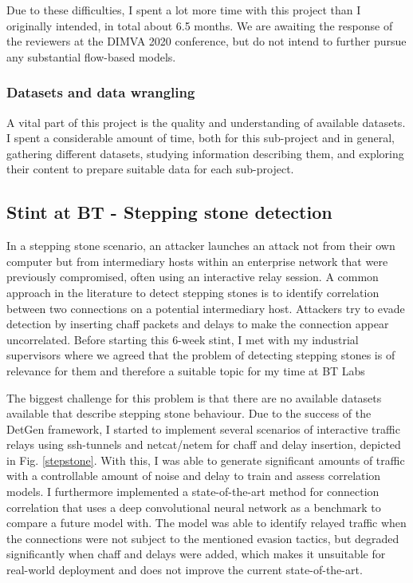 \documentclass[a4paper,12pt,twoside]{article}
\begin{document}
Due to these difficulties, I spent a lot more time with this project than I originally intended, in total about 6.5 months. We are awaiting the response of the reviewers at the DIMVA 2020 conference, but do not intend to further pursue any substantial flow-based models.

\subsubsection{Datasets and data wrangling} 
 
A vital part of this project is the quality and understanding of available datasets. I spent a considerable amount of time, both for this sub-project and in general, gathering different datasets, studying information describing them, and exploring their content to prepare suitable data for each sub-project.


\subsection{Stint at BT - Stepping stone detection}\label{Sec:BTstint}


In a stepping stone scenario, an attacker launches an attack not from their own computer but from intermediary hosts within an enterprise network that were previously compromised, often using an interactive relay session. A common approach in the literature to detect stepping stones is to identify correlation between two connections on a potential intermediary host. Attackers try to evade detection by inserting chaff packets and delays to make the connection appear uncorrelated. Before starting this 6-week stint, I met with my industrial supervisors where we agreed that the problem of detecting stepping stones is of relevance for them and therefore a suitable topic for my time at BT Labs

The biggest challenge for this problem is that there are no available datasets available that describe stepping stone behaviour. Due to the success of the  DetGen framework, I started to implement several scenarios of interactive traffic relays using ssh-tunnels and netcat/netem for chaff and delay insertion, depicted in Fig. \ref{stepstone}. With this, I was able to generate significant amounts of traffic with a controllable amount of noise and delay to train and assess correlation models. 
I furthermore implemented a state-of-the-art method for connection correlation \cite{nasr2018deepcorr} that uses a deep convolutional neural network as a benchmark to compare a future model with. The model was able to identify relayed traffic when the connections were not subject to the mentioned evasion tactics, but degraded significantly when chaff and delays were added, which makes it unsuitable for real-world deployment and does not improve the current state-of-the-art. 
\end{document}
